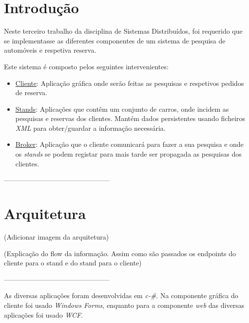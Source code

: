 \documentclass[a4paper]{article}
\begin{document}
\newpage
\thispagestyle{empty} %

\tableofcontents

\newpage
\setcounter{page}{1} %

\section{Introdução}

Neste terceiro trabalho da disciplina de Sistemas Distribuídos, foi requerido que se implementasse as diferentes componentes de um sistema de pesquisa de automóveis e respetiva reserva.

Este sistema é composto pelos seguintes intervenientes:

\begin{itemize}

\item
\underline{Cliente}: Aplicação gráfica onde serão feitas as pesquisas e respetivos pedidos de reserva.

\item
\underline{Stands}: Aplicações que contêm um conjunto de carros, onde incidem as pesquisas e reservas dos clientes. Mantém dados persistentes usando ficheiros \emph{XML} para obter/guardar a informação necessária. 

\item
\underline{Broker}: Aplicação que o cliente comunicará para fazer a sua pesquisa e onde os \emph{stands} se podem registar para mais tarde ser propagada as pesquisas dos clientes.

\end{itemize}

-----------------------------------------------

\section{Arquitetura}
(Adicionar imagem da arquitetura)

(Explicação do flow da informação. Assim como são passados os endpoints do cliente para o stand e do stand para o cliente)

-----------------------------------------------

As diversas aplicações foram desenvolvidas em \emph{c-\#}. Na componente gráfica do cliente foi usado \emph{Windows Forms}, enquanto para a componente \emph{web} das diversas aplicações foi usado \emph{WCF}.
\end{document}
